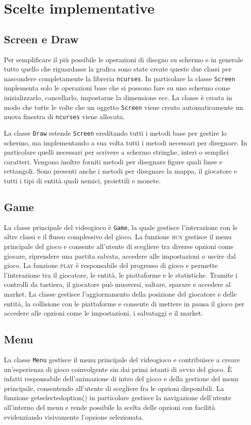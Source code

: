 \documentclass[a4paper]{article}
\begin{document}
\section{Scelte implementative}
\subsection{Screen e Draw}
Per semplificare il più possibile le operazioni di disegno su schermo e in 
generale tutto quello che riguardasse la grafica sono state create queste due
classi per nascondere completamente la libreria \texttt{ncurses}. In particolare
la classe \texttt{Screen} implementa solo le operazioni base che si possono fare
su uno schermo come inizializzarlo, cancellarlo, impostarne la dimensione ecc.
La classe è creata in modo che tutte le volte che un oggetto \texttt{Screen} 
viene creato automaticamente un nuova finestra di \texttt{ncurses} viene 
allocata.

La classe \texttt{Draw} estende \texttt{Screen} ereditando tutti i metodi base
per gestire lo schermo, ma implementando a sua volta tutti i metodi necessari 
per disegnare. In particolare quelli necessari per scrivere a schermo stringhe, 
interi o semplici caratteri. Vengono inoltre forniti metodi per disegnare figure 
quali linee e rettangoli. Sono presenti anche i metodi per disegnare la mappa, 
il giocatore e tutti i tipi di entità quali nemici, proiettili e monete.

\subsection{Game}
La classe principale del videogioco è \texttt{Game}, la quale gestisce l’interazione
con le altre classi e il flusso complessivo del gioco. La funzione \textsc{run} gestisce 
il menu principale del gioco e consente all’utente di scegliere tra diverse opzioni 
come giocare, riprendere una partita salvata, accedere alle impostazioni o uscire dal gioco. 
La funzione \textsc{play} è responsabile del progresso di gioco e permette l’interazione tra 
il giocatore, le entità, le piattaforme e le statistiche. Tramite i controlli da tastiera, 
il giocatore può muoversi, saltare, sparare e accedere al market. La classe gestisce 
l’aggiornamento della posizione del giocatore e delle entità, la collisione con le piattaforme
e consente di mettere in pausa il gioco per accedere alle opzioni come le impostazioni, 
i salvataggi e il market.

\subsection{Menu}
La classe \texttt{Menu} gestisce il menu principale del videogioco e contribuisce 
a creare un’esperienza di gioco coinvolgente sin dai primi istanti di avvio del gioco. 
È infatti responsabile dell’animazione di intro del gioco e della gestione del menu principale,
consentendo all’utente di scegliere fra le opzioni disponibili. La funzione getselectedoption()
in particolare gestisce la navigazione dell’utente all’interno del menu e rende possibile la
scelta delle opzioni con facilità evidenziando visivamente l’opzione selezionata. 
\end{document}
